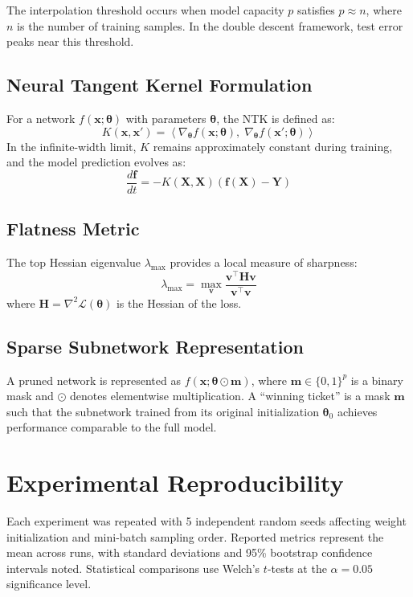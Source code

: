 \documentclass[conference]{IEEEtran}
\begin{document}
The interpolation threshold occurs when model capacity $p$ satisfies $p \approx n$, where $n$ is the number of training samples. In the double descent framework, test error peaks near this threshold.

\subsection{Neural Tangent Kernel Formulation}

For a network $f(\mathbf{x}; \boldsymbol{\theta})$ with parameters $\boldsymbol{\theta}$, the NTK is defined as:
\begin{equation}
    K(\mathbf{x}, \mathbf{x}') = \left\langle \nabla_{\boldsymbol{\theta}} f(\mathbf{x}; \boldsymbol{\theta}),\; \nabla_{\boldsymbol{\theta}} f(\mathbf{x}'; \boldsymbol{\theta}) \right\rangle
\end{equation}
In the infinite-width limit, $K$ remains approximately constant during training, and the model prediction evolves as:
\begin{equation}
    \frac{d\mathbf{f}}{dt} = -K(\mathbf{X}, \mathbf{X})(\mathbf{f}(\mathbf{X}) - \mathbf{Y})
\end{equation}

\subsection{Flatness Metric}

The top Hessian eigenvalue $\lambda_{\max}$ provides a local measure of sharpness:
\begin{equation}
    \lambda_{\max} = \max_{\mathbf{v}} \frac{\mathbf{v}^\top \mathbf{H} \mathbf{v}}{\mathbf{v}^\top \mathbf{v}}
\end{equation}
where $\mathbf{H} = \nabla^2 \mathcal{L}(\boldsymbol{\theta})$ is the Hessian of the loss.

\subsection{Sparse Subnetwork Representation}

A pruned network is represented as $f(\mathbf{x}; \boldsymbol{\theta} \odot \mathbf{m})$, where $\mathbf{m} \in \{0,1\}^p$ is a binary mask and $\odot$ denotes elementwise multiplication. A ``winning ticket'' is a mask $\mathbf{m}$ such that the subnetwork trained from its original initialization $\boldsymbol{\theta}_0$ achieves performance comparable to the full model.

\section{Experimental Reproducibility}

Each experiment was repeated with 5 independent random seeds affecting weight initialization and mini-batch sampling order. Reported metrics represent the mean across runs, with standard deviations and 95\% bootstrap confidence intervals noted. Statistical comparisons use Welch's $t$-tests at the $\alpha = 0.05$ significance level.
\end{document}
